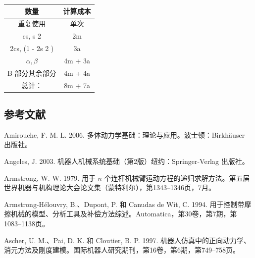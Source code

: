 \documentclass[10pt,a4paper]{book}
\theoremstyle{thmstyle} %
\theoremstyle{defstyle} %
\theoremstyle{prostyle} %
\begin{document}
\begin{table}[htbp]

\centering

\begin{tabular}{cc}

\toprule

数量 & 计算成本 \\

\midrule

重复使用 & 单次 \\

cs, s 2 & 2m \\

2cs, (1 - 2s 2 ) & 3a \\

$α, β$ & 4m + 3a \\

B 部分其余部分 & 4m + 4a \\

总计： & 8m + 7a \\

\bottomrule

\end{tabular}

\end{table}



\subsection{参考文献}





Amirouche, F. M. L. 2006. 多体动力学基础：理论与应用。波士顿：Birkhäuser 出版社。



Angeles, J. 2003. 机器人机械系统基础（第2版）纽约：Springer-Verlag 出版社。



Armstrong, W. W. 1979. 用于 $n$ 个连杆机械臂运动方程的递归求解方法。第五届世界机器与机构理论大会论文集（蒙特利尔），第1343–1346页，7月。



Armstrong-Hélouvry, B.、Dupont, P. 和 Canudas de Wit, C. 1994. 用于控制带摩擦机械的模型、分析工具及补偿方法综述。Automatica，第30卷，第7期，第1083–1138页。



Ascher, U. M.、Pai, D. K. 和 Cloutier, B. P. 1997. 机器人仿真中的正向动力学、消元方法及刚度建模。国际机器人研究期刊，第16卷，第6期，第749–758页。
\end{document}
